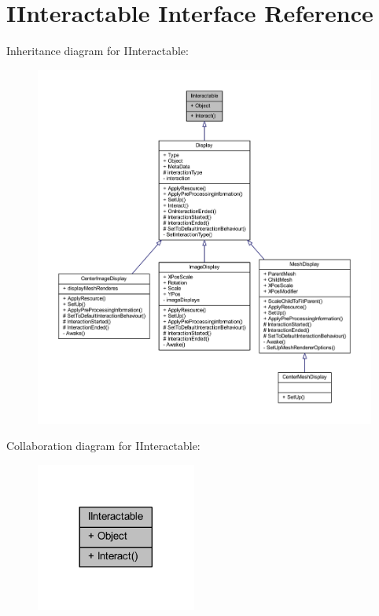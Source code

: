 \hypertarget{interface_i_interactable}{}\section{I\+Interactable Interface Reference}
\label{interface_i_interactable}


Inheritance diagram for I\+Interactable\+:
\nopagebreak
\begin{figure}[H]
\begin{center}
\leavevmode
\includegraphics[width=350pt]{interface_i_interactable__inherit__graph}
\end{center}
\end{figure}


Collaboration diagram for I\+Interactable\+:\nopagebreak
\begin{figure}[H]
\begin{center}
\leavevmode
\includegraphics[width=149pt]{interface_i_interactable__coll__graph}
\end{center}
\end{figure}
